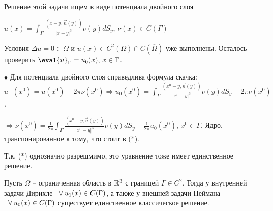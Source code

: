 Решение этой задачи ищем в виде потенциала двойного слоя 

$u(x) = \int_{\Gamma} \frac{(x - y, \vec{n}(y))}{|x - y|^3}\nu(y)dS_y, \, \nu(x) \in C({\Gamma})$

Условия $\Delta u = 0 \in \Omega$ и $u(x) \in C^2(\Omega) \cap C(\overline{\Omega})$ уже выполнены. Осталось проверить $\eval{u}_{{\Gamma}} = u_0(x), \, x \in {\Gamma}$.

$\bullet$ Для потенциала двойного слоя справедлива формула скачка: $u_+(x^0) = u(x^0) - 2\pi\nu(x^0) \Rightarrow u_0(x^0) = \int_{\Gamma} \frac{(x^0 - y, \vec{n}(y))}{|x^0 - y|^3}\nu(y)dS_y - 2\pi\nu(x^0)$.

$\Rightarrow \nu(x^0) = \frac{1}{2\pi} \int_{\Gamma} \frac{(x^0 - y, \vec{n}(y))}{|x^0 - y|^3}\nu(y)dS_y - \frac{1}{2\pi} u_0(x^0), \, x^0 \in {\Gamma}$. Ядро, транспонированное к тому, что стоит в (*).

Т.к. (*) однозначно разрешмимо, это уравнение тоже имеет единственное решение.

\begin{theorem} Пусть $\Omega$ -- ограниченная область в $\mathbb{R}^3$ с границей ${\Gamma} \in C^2$. Тогда у внутренней задачи Дирихле $\;\;\forall\: u_1(x) \in C({\Gamma})$, а также у внешней задачи Неймана $\;\;\forall\: u_0(x) \in C({\Gamma})$ существует единственное классическое решение.
\end{theorem} 
